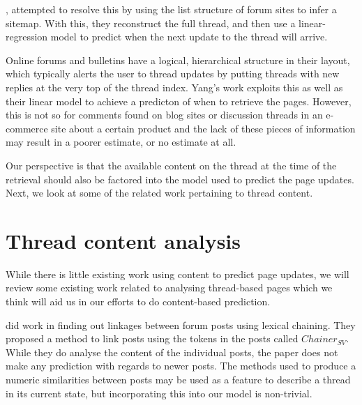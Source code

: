 , attempted to resolve this by using the list structure of 
forum sites to infer a sitemap. With this, they reconstruct the full thread, and 
then use a linear-regression model to predict when the next update to the thread 
will arrive. %

Online forums and bulletins have a logical, hierarchical structure in their 
layout, which typically alerts the user to thread updates by putting threads 
with new replies at the very top of the thread index. Yang's work exploits this 
as well as their linear model to achieve a predicton of when to retrieve the 
pages.
However, this is not so for comments found on blog sites or discussion threads 
in an e-commerce site about a certain product and the lack of these pieces of 
information may result in a poorer estimate, or no estimate at all.


Our perspective is that the available content on the thread at the time of the 
retrieval should also be factored into the model used to predict the page 
updates. Next, we look at some of the related work pertaining to thread content.

\section{Thread content analysis}
While there is little existing work using content to predict page updates, we 
will review some existing work related to analysing thread-based pages which we 
think will aid us in our efforts to do content-based prediction.

 did work in finding out linkages between forum posts using 
lexical chaining. They proposed a method to link posts using the tokens in the 
posts called $Chainer_{SV}$. While they do analyse the content of the individual 
posts, the paper does not make any prediction with regards to newer posts. The 
methods used to produce a numeric similarities between posts may be used as a 
feature to describe a thread in its current state, but incorporating this into 
our model is non-trivial.



